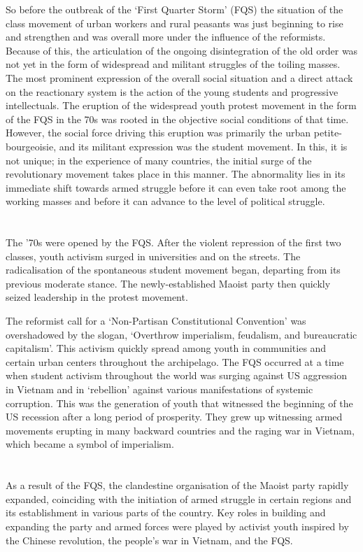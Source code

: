 So before the outbreak of the `First Quarter Storm' (FQS) 
the situation of the class movement of urban workers and rural peasants 
was just beginning to rise and strengthen 
and was overall more under the influence of the reformists. 
Because of this, 
the articulation of the ongoing disintegration of the old order
was not yet in the form 
of widespread and militant struggles of the toiling masses.
The most prominent expression 
of the overall social situation 
and a direct attack on the reactionary system 
is the action of the young students and progressive intellectuals. 
The eruption of the widespread youth protest movement 
in the form of the FQS in the 70s 
was rooted in the objective social conditions of that time. 
However, the social force driving this eruption 
was primarily the urban petite-bourgeoisie, 
and its militant expression was the student movement. 
In this, it is not unique;
in the experience of many countries, 
the initial surge of the revolutionary movement 
takes place in this manner. 
The abnormality lies in its immediate shift 
towards armed struggle 
before it can even take root among the working masses 
and before it can advance to the level of political struggle.


\section{}
The '70s were opened by the FQS. 
After the violent repression of the first two classes, 
youth activism surged in universities and on the streets. 
The radicalisation of the spontaneous student movement began, 
departing from its previous moderate stance. 
The newly-established Maoist party 
then quickly seized leadership in the protest movement.

The reformist call for a `Non-Partisan Constitutional Convention' 
was overshadowed by the slogan,
`Overthrow imperialism, feudalism, and bureaucratic capitalism'. 
This activism quickly spread among 
youth in communities and certain urban centers 
throughout the archipelago.
The FQS occurred at a time 
when student activism throughout the world was surging 
against US aggression in Vietnam 
and in `rebellion' against various manifestations of systemic corruption. 
This was the generation of youth 
that witnessed the beginning of the US recession 
after a long period of prosperity. 
They grew up witnessing armed movements 
erupting in many backward countries 
and the raging war in Vietnam, 
which became a symbol of imperialism.

\section{}
As a result of the FQS, 
the clandestine organisation of the Maoist party rapidly expanded, 
coinciding with the initiation of armed struggle in certain regions 
and its establishment in various parts of the country. 
Key roles in building and expanding the party and armed forces 
were played by activist youth 
inspired by the Chinese revolution, 
the people's war in Vietnam, 
and the FQS.

